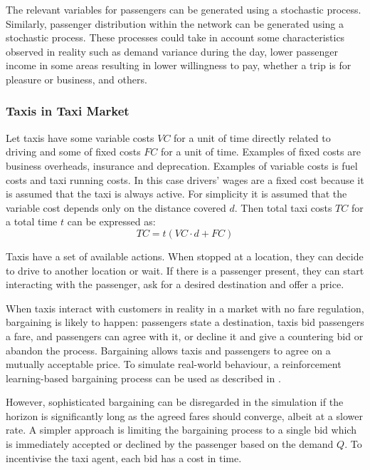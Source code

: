 The relevant variables for passengers can be generated using a stochastic
process. Similarly, passenger distribution within the network can be generated
using a stochastic process. These processes could take in account some
characteristics observed in reality such as demand variance during the day,
lower passenger income in some areas resulting in lower willingness to pay,
whether a trip is for pleasure or business, and others.


\subsubsection{Taxis in Taxi Market}
\label{sec:requirements:taxi}

Let taxis have some variable costs \(VC\) for a unit of time directly related
to driving and some of fixed costs \(FC\) for a unit of time. Examples of fixed
costs are business overheads, insurance and deprecation. Examples of variable
costs is fuel costs and taxi running costs. In this case drivers' wages are a
fixed cost because it is assumed that the taxi is always active. For simplicity
it is assumed that the variable cost depends only on the distance covered
\(d\). Then total taxi costs \(TC\) for a total time \(t\) can be expressed as:
\[ TC = t(VC\cdot d + FC) \]

Taxis have a set of available actions. When stopped at a location, they can
decide to drive to another location or wait. If there is a passenger present,
they can start interacting with the passenger, ask for a desired destination
and offer a price.

When taxis interact with customers in reality in a market with no fare
regulation, bargaining is likely to happen: passengers state a destination,
taxis bid passengers a fare, and passengers can agree with it, or decline it
and give a countering bid or abandon the process. Bargaining allows taxis and
passengers to agree on a mutually acceptable price. To simulate real-world
behaviour, a reinforcement learning-based bargaining process can be used as
described in \textcite{Cli1997taxi+bargaining}.

However, sophisticated bargaining can be disregarded in the simulation if the
horizon is significantly long as the agreed fares should converge, albeit at a
slower rate. A simpler approach is limiting the bargaining process to a single
bid which is immediately accepted or declined by the passenger based on the
demand \(Q\). To incentivise the taxi agent, each bid has a cost in time.


